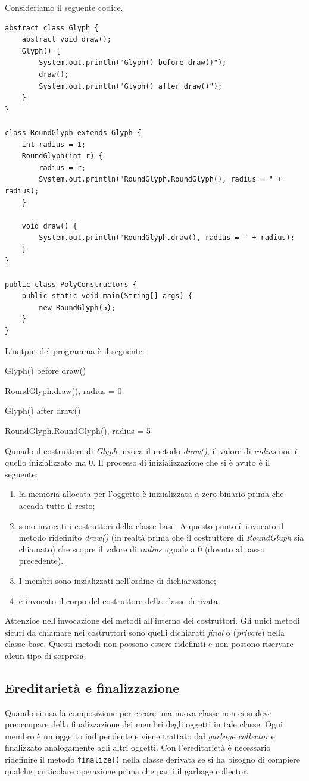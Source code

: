\documentclass[12pt]{report}
\begin{document}
Consideriamo il seguente codice.
\begin{lstlisting}[style=javastyle]
abstract class Glyph {
	abstract void draw();
	Glyph() {
		System.out.println("Glyph() before draw()");
		draw();
		System.out.println("Glyph() after draw()");
	}
}

class RoundGlyph extends Glyph {
	int radius = 1;
	RoundGlyph(int r) {
		radius = r;
		System.out.println("RoundGlyph.RoundGlyph(), radius = " + radius);
	}

	void draw() {
		System.out.println("RoundGlyph.draw(), radius = " + radius);
	}
}

public class PolyConstructors {
	public static void main(String[] args) {
		new RoundGlyph(5);
	}
}
\end{lstlisting}
L'output del programma è il seguente:
\begin{center}
Glyph() before draw()

RoundGlyph.draw(), radius = 0

Glyph() after draw()

RoundGlyph.RoundGlyph(), radius = 5
\end{center}
Qunado il costruttore di \textit{Glyph} invoca il metodo \textit{draw()}, il valore di \textit{radius} non è quello inizializzato ma 0. Il processo di inizializzazione che si è avuto è il seguente:
\begin{enumerate}
	\item la memoria allocata per l'oggetto è inizializzata a zero binario prima che accada tutto il resto;
	\item sono invocati i costruttori della classe base. A questo punto è invocato il metodo ridefinito \textit{draw()} (in realtà prima che il costruttore di \textit{RoundGluph} sia chiamato) che scopre il valore di \textit{radius} uguale a 0 (dovuto al passo precedente).
	\item I membri sono inzializzati nell'ordine di dichiarazione;
	\item è invocato il corpo del costruttore della classe derivata.
\end{enumerate}
\begin{note}{}{}
Attenzioe nell'invocazione dei metodi all'interno dei costruttori. Gli unici metodi sicuri da chiamare nei costruttori sono quelli dichiarati \textit{final} o (\textit{private}) nella classe base. Questi metodi non possono essere ridefiniti e non possono riservare alcun tipo di sorpresa.
\end{note}
\subsection{Ereditarietà e finalizzazione}
Quando si usa la composizione per creare una nuova classe non ci si deve preoccupare della finalizzazione dei membri degli oggetti in tale classe. Ogni membro è un oggetto indipendente e viene trattato dal \textit{garbage collector} e finalizzato analogamente agli altri oggetti. Con l'ereditarietà è necessario ridefinire il metodo \texttt{finalize()} nella classe derivata se si ha bisogno di compiere qualche particolare operazione prima che parti il garbage collector.
\end{document}
